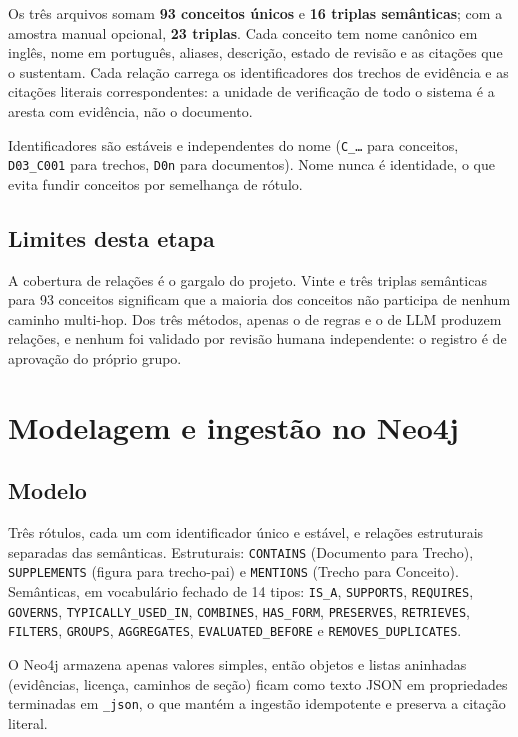 \documentclass[12pt]{article}
\begin{document}
Os três arquivos somam \textbf{93 conceitos únicos} e \textbf{16 triplas semânticas}; com a amostra
manual opcional, \textbf{23 triplas}. Cada conceito tem nome canônico em inglês, nome em português,
aliases, descrição, estado de revisão e as citações que o sustentam. Cada relação carrega os
identificadores dos trechos de evidência e as citações literais correspondentes: a unidade de
verificação de todo o sistema é a aresta com evidência, não o documento.

Identificadores são estáveis e independentes do nome (\texttt{C\_\ldots} para conceitos,
\texttt{D03\_C001} para trechos, \texttt{D0n} para documentos). Nome nunca é identidade, o que
evita fundir conceitos por semelhança de rótulo.

\subsection{Limites desta etapa}

A cobertura de relações é o gargalo do projeto. Vinte e três triplas semânticas para 93 conceitos
significam que a maioria dos conceitos não participa de nenhum caminho multi-hop. Dos três
métodos, apenas o de regras e o de LLM produzem relações, e nenhum foi validado por revisão humana
independente: o registro é de aprovação do próprio grupo.

\section{Modelagem e ingestão no Neo4j}

\subsection{Modelo}

Três rótulos, cada um com identificador único e estável, e relações estruturais separadas das
semânticas. Estruturais: \texttt{CONTAINS} (Documento para Trecho), \texttt{SUPPLEMENTS} (figura
para trecho-pai) e \texttt{MENTIONS} (Trecho para Conceito). Semânticas, em vocabulário fechado de
14 tipos: \texttt{IS\_A}, \texttt{SUPPORTS}, \texttt{REQUIRES}, \texttt{GOVERNS},
\texttt{TYPICALLY\_USED\_IN}, \texttt{COMBINES}, \texttt{HAS\_FORM}, \texttt{PRESERVES},
\texttt{RETRIEVES}, \texttt{FILTERS}, \texttt{GROUPS}, \texttt{AGGREGATES},
\texttt{EVALUATED\_BEFORE} e \texttt{REMOVES\_DUPLICATES}.

O Neo4j armazena apenas valores simples, então objetos e listas aninhadas (evidências, licença,
caminhos de seção) ficam como texto JSON em propriedades terminadas em \texttt{\_json}, o que
mantém a ingestão idempotente e preserva a citação literal.
\end{document}
